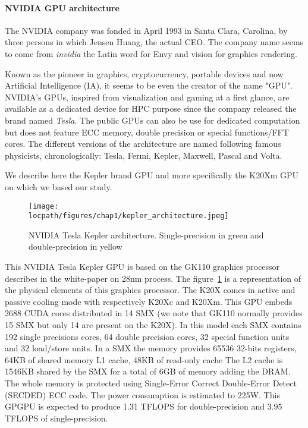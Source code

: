 \paragraph{NVIDIA GPU architecture}
The NVIDIA company was fonded in April 1993 in Santa Clara, Carolina, by three persons in which Jensen Huang, the actual CEO.
The company name seems to come from \textit{invidia} the Latin word for Envy and vision for graphics rendering. 

Known as the pioneer in graphics, cryptocurrency, portable devices and now Artificial Intelligence (IA), it seems to be even the creator of the name "GPU".
NVIDIA's GPUs, inspired from visualization and gaming at a first glance, are available as a dedicated device for HPC purpose since the company released the brand named \textit{Tesla}. 
The public GPUs can also be use for dedicated computation but does not feature ECC memory, double precision or special functions/FFT cores. 
The different versions of the architecture are named following famous physicists, chronologically: Tesla, Fermi, Kepler, Maxwell, Pascal and Volta.

We describe here the Kepler brand GPU and more specifically the K20Xm GPU on which we based our study. 
\begin{figure}
\centering
\texttt{[image: \\locpath/figures/chap1/kepler\_architecture.jpeg]}
\caption{NVIDIA Tesla Kepler architecture. Single-precision in green and double-precision in yellow}
\label{fig:2_HARD:kepler_arch}
\end{figure}
This NVIDIA Tesla Kepler GPU is based on the GK110 graphics processor describes in the white-paper\cite{nvidia2012nvidias} on 28nm process.
The figure~\ref{fig:2_HARD:kepler_arch} is a representation of the physical elements of this graphics processor. 
The K20X comes in active and passive cooling mode with respectively K20Xc and K20Xm.
This GPU embeds 2688 CUDA cores distributed in 14 SMX (we note that GK110 normally provides 15 SMX but only 14 are present  on the K20X).
In this model each SMX contains 192 single precisions cores, 64 double precision cores, 32 special function units and 32 load/store units.
In a SMX the memory provides 65536 32-bits registers, 64KB of shared memory L1 cache, 48KB of read-only cache
The L2 cache is 1546KB shared by the SMX for a total of 6GB of memory adding the DRAM.
The whole memory is protected using Single‐Error Correct Double‐Error Detect (SECDED) ECC code.
The power consumption is estimated to 225W.
This GPGPU is expected to produce 1.31 TFLOPS for double-precision and 3.95 TFLOPS of single-precision.

